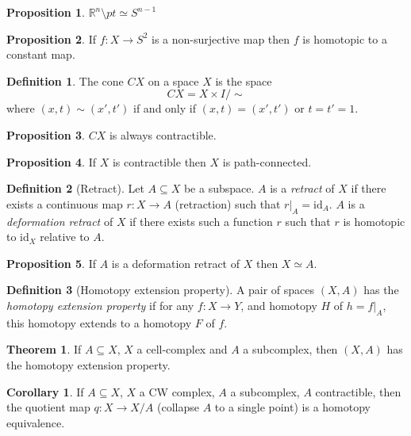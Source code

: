 \documentclass[a4paper,14pt]{extarticle}
\theoremstyle{definition}
\newtheorem*{theorem}{Theorem}
\newtheorem*{definition}{Definition}
\newtheorem*{corollary}{Corollary}
\newtheorem*{proposition}{Proposition}
\begin{document}
\begin{proposition}
  $\mathbb{R}^n\setminus pt\simeq S^{n-1}$
\end{proposition}

\begin{proposition}
  If $f:X\rightarrow S^2$ is a non-surjective map then $f$ is homotopic to a constant 
  map.
\end{proposition}

\begin{definition}
  The cone $CX$ on a space $X$ is the space
  \[CX=X\times I/\sim\] where $(x,t)\sim(x',t')$ if and only if $(x,t)=(x',t')$ or 
  $t=t'=1$.
\end{definition}

\begin{proposition}
  $CX$ is always contractible.
\end{proposition}

\begin{proposition}
  If $X$ is contractible then $X$ is path-connected.
\end{proposition}

\begin{definition}[Retract]
  Let $A\subseteq X$ be a subspace. $A$ is a \emph{retract} of $X$ if there exists a continuous map $r:X\rightarrow A$ (retraction) such that $r|_A=\text{id}_A$. $A$ is a \emph{deformation
  retract} of $X$ if there exists such a function $r$ such that $r$ is homotopic to 
  $\text{id}_X$ relative to $A$.
\end{definition}

\begin{proposition}
  If $A$ is a deformation retract of $X$ then $X\simeq A$.
\end{proposition}

\begin{definition}[Homotopy extension property]
  A pair of spaces $(X,A)$ has the \textit{homotopy extension property} if for any 
  $f:X\rightarrow Y$, and homotopy $H$ of $h=f|_A$, this homotopy extends to a homotopy 
  $F$ of $f$.
\end{definition}

\begin{theorem}
  If $A\subseteq X$, $X$ a cell-complex and $A$ a subcomplex, then $(X,A)$ has the 
  homotopy extension property.
\end{theorem}

\begin{corollary}
  If $A\subseteq X$, $X$ a CW complex, $A$ a subcomplex, $A$ contractible, then the 
  quotient map $q:X\rightarrow X/A$ (collapse $A$ to a single point) is a homotopy 
  equivalence.
\end{corollary}
\end{document}

